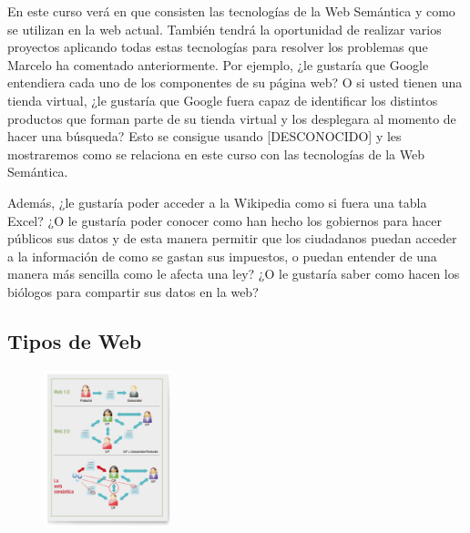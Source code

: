 En este curso verá en que consisten las tecnologías de la Web Semántica y como se utilizan en la web actual. También tendrá la oportunidad de realizar varios proyectos aplicando todas estas tecnologías para resolver los problemas que Marcelo ha comentado anteriormente. Por ejemplo, ¿le gustaría que Google entendiera cada uno de los componentes de su página web? O si usted tienen una tienda virtual, ¿le gustaría que Google fuera capaz de identificar los distintos productos que forman parte de su tienda virtual y los desplegara al momento de hacer una búsqueda? Esto se consigue usando [DESCONOCIDO] y les mostraremos como se relaciona en este curso con las tecnologías de la Web Semántica.

Además, ¿le gustaría poder acceder a la Wikipedia como si fuera una tabla Excel? ¿O le gustaría poder conocer como han hecho los gobiernos para hacer públicos sus datos y de esta manera permitir que los ciudadanos puedan acceder a la información de como se gastan sus impuestos, o puedan entender de una manera más sencilla como le afecta una ley? ¿O le gustaría saber como hacen los biólogos para compartir sus datos en la web?


\subsection{Tipos de Web} %





\begin{figure}[H]
	\centering
	\includegraphics[height=4.5cm]{imagenes/capitulo3/10}
	\caption{}
\end{figure}

